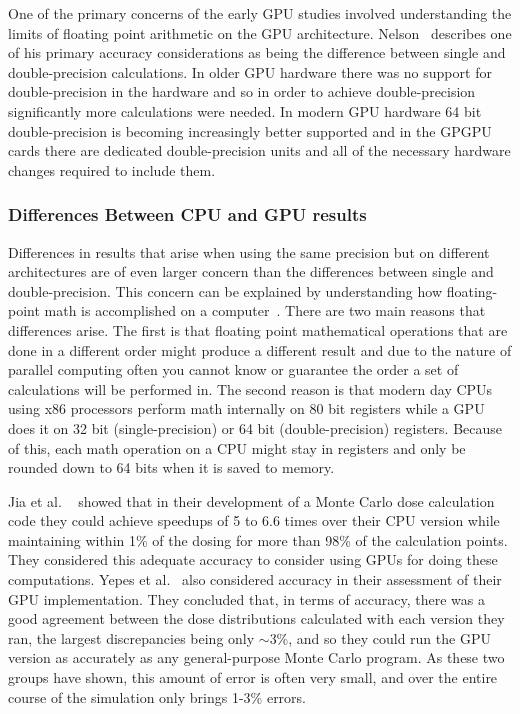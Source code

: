 One of the primary concerns of the early GPU studies involved understanding the limits of floating point arithmetic on the GPU architecture.
%
Nelson~\cite{nelson2009monte} describes one of his primary accuracy considerations as being the difference between single and double-precision calculations.
%
In older GPU hardware there was no support for double-precision in the hardware and so in order to achieve double-precision significantly more calculations were needed.
%
In modern GPU hardware 64 bit double-precision is becoming increasingly better supported and in the GPGPU cards there are dedicated double-precision units and all of the necessary hardware changes required to include them.
%

\subsubsection*{\textbf{Differences Between CPU and GPU results}}

Differences in results that arise when using the same precision but on different architectures are of even
larger concern than the differences between single and double-precision.
%
This concern can be explained by understanding how floating-point math is accomplished on a computer~\cite{goldberg1991every}.
%
There are two main reasons that differences arise.
%
The first is that floating point mathematical operations that are done in a different order might produce a different result and due to the nature of parallel computing often you cannot know or guarantee the order a set of calculations will be performed in.
%
The second reason is that modern day CPUs using x86 processors perform math internally on 80 bit registers while a GPU does it on 32 bit (single-precision) or 64 bit (double-precision) registers.
%
Because of this, each math operation on a CPU might stay in registers and only be rounded down to 64 bits when it is saved to memory.
%

%
Jia et al. ~\cite{jia2010development} showed that in their development of a Monte Carlo dose calculation code they could achieve speedups of 5 to 6.6 times over their CPU version while maintaining within 1\% of the dosing for more than 98\% of the calculation points.
%
They considered this adequate accuracy to consider using GPUs for doing these computations.
%
Yepes et al.~\cite{yepes2010gpu} also considered accuracy in their assessment of their GPU implementation.
%
They concluded that, in terms of accuracy, there was a good agreement between the dose distributions calculated with each version they ran, the largest discrepancies being only $\sim$3\%, and so they could run the GPU version as accurately as any general-purpose Monte Carlo program.
%
As these two groups have shown, this amount of error is often very small, and over the entire course of the simulation only brings 1-3\% errors.

